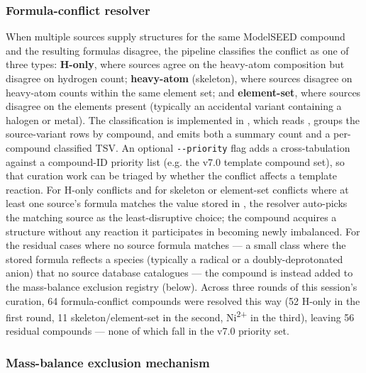 \subsubsection{Formula-conflict resolver}

When multiple sources supply structures for the same ModelSEED compound and the
resulting formulas disagree, the pipeline classifies the conflict as one of
three types: \textbf{H-only}, where sources agree on the heavy-atom composition
but disagree on hydrogen count; \textbf{heavy-atom} (skeleton), where sources
disagree on heavy-atom counts within the same element set; and
\textbf{element-set}, where sources disagree on the elements present (typically
an accidental variant containing a halogen or metal). The classification is
implemented in , which
reads , groups the
source-variant rows by compound, and emits both a summary count and a
per-compound classified TSV. An optional \texttt{-{}-priority} flag adds a
cross-tabulation against a compound-ID priority list (e.g. the v7.0 template
compound set), so that curation work can be triaged by whether the conflict
affects a template reaction. For H-only conflicts and for skeleton or
element-set conflicts where at least one source's formula matches the value
stored in , the resolver auto-picks the matching source
as the least-disruptive choice; the compound acquires a structure without any
reaction it participates in becoming newly imbalanced. For the residual cases
where no source formula matches --- a small class where the stored formula
reflects a species (typically a radical or a doubly-deprotonated anion) that no
source database catalogues --- the compound is instead added to the
mass-balance exclusion registry (below). Across three rounds of this session's
curation, 64 formula-conflict compounds were resolved this way (52 H-only in the
first round, 11 skeleton/element-set in the second, 
Ni\textsuperscript{2+} in the third), leaving 56 residual compounds --- none of
which fall in the v7.0 priority set.

\subsubsection{Mass-balance exclusion mechanism}

